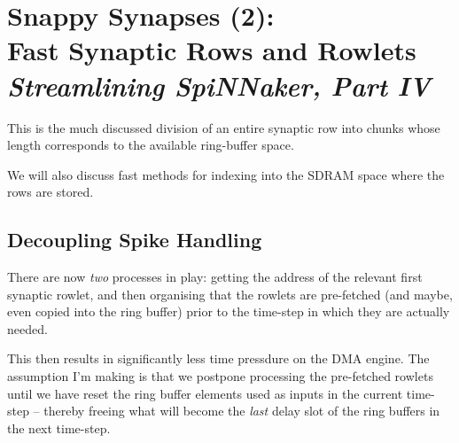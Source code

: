 \chapter[Snappy Synapses (2)]{Snappy Synapses (2):\\
Fast Synaptic Rows and Rowlets\\
{\it Streamlining SpiNNaker, Part IV}}

This is the much discussed division of an entire synaptic row into
chunks whose length corresponds to the available ring-buffer space.

We will also discuss fast methods for indexing into the SDRAM space where
the rows are stored.

\section{Decoupling Spike Handling}

There are now {\em two} processes in play: getting the address of the
relevant first synaptic rowlet, and then organising that the rowlets
are pre-fetched (and maybe, even copied into the ring buffer) prior to
the time-step in which they are actually needed.

This then results in significantly less time pressdure on the DMA
engine. The assumption I'm making is that we postpone processing the
pre-fetched rowlets until we have reset the ring buffer elements used
as inputs in the current time-step -- thereby freeing what will become
the {\em last} delay slot of the ring buffers in the next time-step.